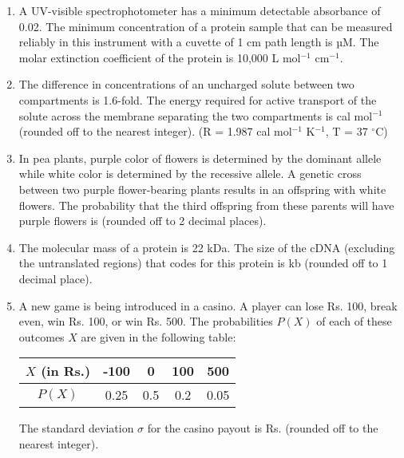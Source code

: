 \documentclass[12pt]{article}
\begin{document}
\begin{enumerate}[label=Q.\arabic*,start=26]
	\item A UV-visible spectrophotometer has a minimum detectable absorbance of 0.02. The minimum concentration of a protein sample that can be measured reliably in this instrument with a cuvette of 1 cm path length is \underline{\hspace{2cm}} µM. The molar extinction coefficient of the protein is 10,000 L mol$^{-1}$ cm$^{-1}$.

	\item The difference in concentrations of an uncharged solute between two compartments is 1.6-fold. The energy required for active transport of the solute across the membrane separating the two compartments is \underline{\hspace{2cm}} cal mol$^{-1}$ (rounded off to the nearest integer). (R = 1.987 cal mol$^{-1}$ K$^{-1}$, T = 37 $^\circ$C)

	\item In pea plants, purple color of flowers is determined by the dominant allele while white color is determined by the recessive allele. A genetic cross between two purple flower-bearing plants results in an offspring with white flowers. The probability that the third offspring from these parents will have purple flowers is \underline{\hspace{2cm}} (rounded off to 2 decimal places).

	\item The molecular mass of a protein is 22 kDa. The size of the cDNA (excluding the untranslated regions) that codes for this protein is \underline{\hspace{2cm}} kb (rounded off to 1 decimal place).
	\item A new game is being introduced in a casino. A player can lose Rs. 100, break even, win Rs. 100, or win Rs. 500. The probabilities $P(X)$ of each of these outcomes $X$ are given in the following table:

		\begin{center}
			\begin{tabular}{|c|c|c|c|c|}
				\hline
				$X$ (in Rs.) & -100 & 0 & 100 & 500 \\
				\hline
				$P(X)$ & 0.25 & 0.5 & 0.2 & 0.05 \\
				\hline
			\end{tabular}
		\end{center}

		The standard deviation $\sigma$ for the casino payout is Rs. \underline{\hspace{2cm}} (rounded off to the nearest integer).


\end{enumerate}
\end{document}

